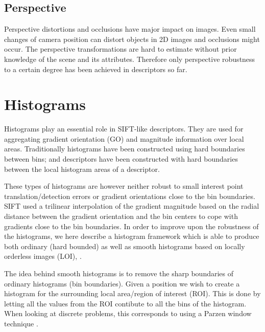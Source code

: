 \documentclass[thesis.tex]{subfiles}
\begin{document}
\subsection{Perspective}
Perspective distortions and occlusions have major impact on images. Even small changes of camera position can distort objects in 2D images and occlusions might occur. The perspective transformations are hard to estimate without prior knowledge of the scene and its attributes. Therefore only perspective robustness to a certain degree has been achieved in descriptors so far.


\section{Histograms}
\label{sec:histograms}

Histograms play an essential role in SIFT-like descriptors. They are used for aggregating gradient orientation (GO) and magnitude information over local areas. Traditionally histograms have been constructed using hard boundaries between bins; and descriptors have been constructed with hard boundaries between the local histogram areas of a descriptor.

These types of histograms are however neither robust to small interest point translation/detection errors or gradient orientations close to the bin boundaries. SIFT used a trilinear interpolation of the gradient magnitude based on the radial distance between the gradient orientation and the bin centers to cope with gradients close to the bin boundaries. In order to improve upon the robustness of the histograms, we here describe a histogram framework which is able to produce both ordinary (hard bounded) as well as smooth histograms based on locally orderless images (LOI), \cite{koenderink1999structure}.

The idea behind smooth histograms is to remove the sharp boundaries of ordinary histograms (bin boundaries). Given a position we wish to create a histogram for the surrounding local area/region of interest (ROI). This is done by letting all the values from the ROI contibute to all the bins of the histogram. When looking at discrete problems, this corresponds to using a Parzen window technique \cite{parzen1962estimation}. 
\end{document}
